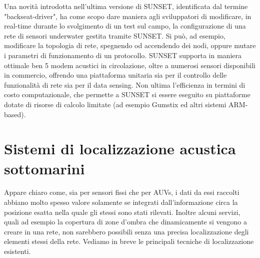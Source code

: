 \documentclass[Lau,binding=0.6cm]{sapthesis}
\begin{document}
Una novità introdotta nell'ultima versione di SUNSET, identificata dal termine "backseat-driver", ha come scopo dare maniera agli sviluppatori di modificare, in real-time durante lo svolgimento di un test sul campo, la configurazione di una rete di sensori underwater gestita tramite SUNSET. Si può, ad esempio, modificare la topologia di rete, spegnendo od accendendo dei nodi, oppure mutare i parametri di funzionamento di un protocollo.
\newline
SUNSET supporta in maniera ottimale ben 5 modem acustici in circolazione, oltre a numerosi sensori disponibili in commercio, offrendo una piattaforma unitaria sia per il controllo delle funzionalità di rete sia per il data sensing. Non ultima l'efficienza in termini di costo computazionale, che permette a SUNSET si essere eseguito su piattaforme dotate di risorse di calcolo limitate (ad esempio Gumstix ed altri sistemi ARM-based).


\section{Sistemi di localizzazione acustica sottomarini}
Appare chiaro come, sia per sensori fissi che per AUVs, i dati da essi raccolti abbiano molto spesso valore solamente se integrati dall'informazione circa la posizione esatta nella quale gli stessi sono stati rilevati. Inoltre alcuni servizi, quali ad esempio la copertura di zone d'ombra che dinamicamente si vengono a creare in una rete, non sarebbero possibili senza una precisa localizzazione degli elementi stessi della rete.
Vediamo in breve le principali tecniche di localizzazione esistenti.
\end{document}
